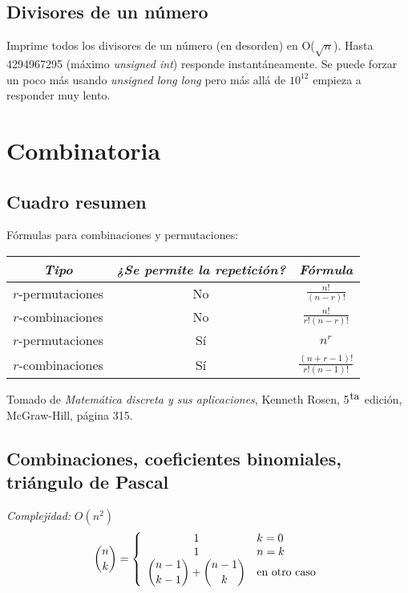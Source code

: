 \documentclass[10pt,letterpaper,twocolumn,twosided]{article}
\newcommand{\codigofuente}[1]{

\dotfill
}
\begin{document}
\subsection{Divisores de un número}
Imprime todos los divisores de un número (en desorden) en O($\sqrt{n}$).
Hasta 4294967295 (máximo \textit{unsigned int}) responde instantáneamente. Se puede
forzar un poco más usando \textit{unsigned long long} pero más allá de $10^{12}$ empieza a
responder muy lento.
\codigofuente{./src/number_theory/divisores.cpp}

\section{Combinatoria}
\subsection{Cuadro resumen}
Fórmulas para combinaciones y permutaciones:
\begin{center}
  \renewcommand{\arraystretch}{2} %
  \begin{tabular}{| c | c | c |}
    \hline
    \textit{Tipo} & \textit{¿Se permite la repetición?} & \textit{Fórmula} \\ [1.5ex]
    \hline\hline

    $r$-permutaciones & No & $ \displaystyle\frac{n!}{(n-r)!} $ \\ [1.5ex]
    \hline
    $r$-combinaciones & No & $ \displaystyle\frac{n!}{r!(n-r)!} $ \\  [1.5ex]
    \hline
    $r$-permutaciones & Sí & $ \displaystyle n^{r} $ \\
    \hline
    $r$-combinaciones & Sí & $ \displaystyle\frac{(n+r-1)!}{r!(n-1)!} $ \\ [1.5ex]
    \hline
  \end{tabular}
  \renewcommand{\arraystretch}{1}
\end{center}
Tomado de \textit{Matemática discreta y sus aplicaciones}, Kenneth Rosen, 5${}^{\hbox{ta}}$ edición, McGraw-Hill, página 315.

\subsection{Combinaciones, coeficientes binomiales, triángulo de Pascal}
\emph{Complejidad:} $ O(n^2) $ \\
$$ {n \choose k} = \left\{
  \begin{array}{c l}
    1 & k = 0\\
    1 & n = k\\
    \displaystyle {n - 1 \choose k - 1} + {n - 1 \choose k} & \mbox{en otro caso}\\
  \end{array}
\right.
$$
\end{document}
